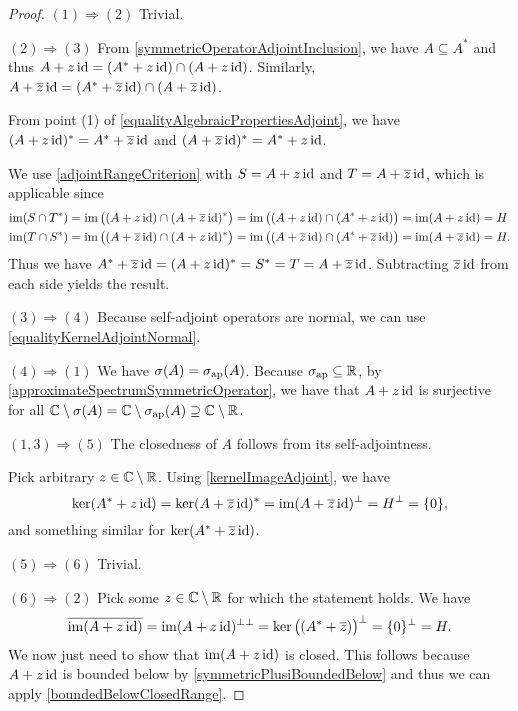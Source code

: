\begin{proof}
$(1) \Rightarrow (2)$ Trivial.

$(2) \Rightarrow (3)$ From \ref{symmetricOperatorAdjointInclusion}, we have $A\subseteq A^*$ and thus $A+z\operatorname{id} = (A^* + z\operatorname{id})\cap(A+z\operatorname{id})$. Similarly, $A+\overline{z}\operatorname{id} = (A^* + \overline{z}\operatorname{id})\cap(A+\overline{z}\operatorname{id})$.

From point (1) of \ref{equalityAlgebraicPropertiesAdjoint}, we have $(A+z\operatorname{id})^* = A^* + \overline{z}\operatorname{id}$ and $(A+\overline{z}\operatorname{id})^* = A^* + z\operatorname{id}$.

We use \ref{adjointRangeCriterion} with $S = A+z\operatorname{id}$ and $T = A+\overline{z}\operatorname{id}$, which is applicable since
\begin{align*}
\operatorname{im}(S\cap T^*) &= \operatorname{im}\big((A+z\operatorname{id})\cap (A+\overline{z}\operatorname{id})^*\big) = \operatorname{im}\big((A+z\operatorname{id})\cap (A^*+z\operatorname{id})\big) = \operatorname{im}(A+z\operatorname{id}) = H \\
\operatorname{im}(T\cap S^*) &= \operatorname{im}\big((A+\overline{z}\operatorname{id})\cap (A+z\operatorname{id})^*\big) = \operatorname{im}\big((A+\overline{z}\operatorname{id})\cap (A^*+\overline{z}\operatorname{id})\big) = \operatorname{im}(A+\overline{z}\operatorname{id}) = H.
\end{align*}
Thus we have $A^* + \overline{z}\operatorname{id} = (A+z\operatorname{id})^* = S^* = T = A+\overline{z}\operatorname{id}$. Subtracting $\overline{z}\operatorname{id}$ from each side yields the result.

$(3) \Rightarrow (4)$ Because self-adjoint operators are normal, we can use \ref{equalityKernelAdjointNormal}.

$(4) \Rightarrow (1)$ We have $\sigma(A) = \sigma_\text{ap}(A)$. Because $\sigma_\text{ap}\subseteq \mathbb{R}$, by \ref{approximateSpectrumSymmetricOperator}, we have that $A+z\operatorname{id}$ is surjective for all $\mathbb{C}\setminus\sigma(A) = \mathbb{C}\setminus\sigma_\text{ap}(A) \supseteq \mathbb{C}\setminus\mathbb{R}$.

$(1,3) \Rightarrow (5)$ The closedness of $A$ follows from its self-adjointness.

Pick arbitrary $z \in \mathbb{C}\setminus\mathbb{R}$. Using \ref{kernelImageAdjoint}, we have
\[ \ker(A^* + z\operatorname{id}) = \ker(A+\overline{z}\operatorname{id})^* =\operatorname{im}(A+\overline{z}\operatorname{id})^\perp = H^\perp = \{0\}, \]
and something similar for $\ker(A^* + \overline{z}\operatorname{id})$.

$(5) \Rightarrow (6)$ Trivial.

$(6) \Rightarrow (2)$ Pick some $z\in\mathbb{C}\setminus \mathbb{R}$ for which the statement holds. We have
\[ \overline{\operatorname{im}(A+z\operatorname{id})} = \operatorname{im}(A+z\operatorname{id})^{\perp\perp} = \ker\big((A^*+\overline{z})\big)^\perp = \{0\}^\perp = H. \]
We now just need to show that $\operatorname{im}(A+z\operatorname{id})$ is closed. This follows because $A+z\operatorname{id}$ is bounded below by \ref{symmetricPlusiBoundedBelow} and thus we can apply \ref{boundedBelowClosedRange}.
\end{proof}
